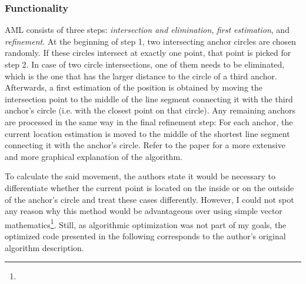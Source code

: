 \subsubsection{Functionality}
AML consists of three steps: \emph{intersection and elimination}, \emph{first estimation}, and \emph{refinement}. At the beginning of step 1, two intersecting anchor circles are chosen randomly. If these circles intersect at exactly one point, that point is picked for step 2. In case of two circle intersections, one of them needs to be eliminated, which is the one that has the larger distance to the circle of a third anchor. Afterwards, a first estimation of the position is obtained by moving the intersection point to the middle of the line segment connecting it with the third anchor's circle (i.e. with the closest point on that circle). 
Any remaining anchors are processed in the same way in the final refinement step: For each anchor, the current location estimation is moved to the middle of the shortest line segment connecting it with the anchor's circle. Refer to the paper for a more extensive and more graphical explanation of the algorithm.

To calculate the said movement, the authors state it would be necessary to differentiate whether the current point is located on the inside or on the outside of the anchor's circle and treat these cases differently. However, I could not spot any reason why this method would be advantageous over using simple vector mathematics\footnote{}. Still, as algorithmic optimization was not part of my goals, the optimized code presented in the following corresponds to the author's original algorithm description.

